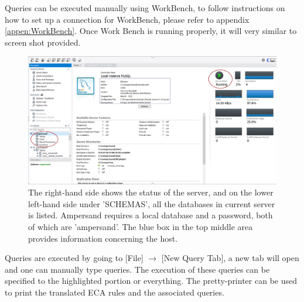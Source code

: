 Queries can be executed manually using WorkBench, to follow instructions on how 
to set up a connection for WorkBench, please refer to appendix 
\ref{appen:WorkBench}. Once Work Bench is running properly, it will very 
similar to screen shot provided.
\begin{figure}[!h]
    \includegraphics[width=\textwidth]{images/WorkBench}
    \caption{\footnotesize{The right-hand side shows the status of the server, 
    and on the lower left-hand side under 'SCHEMAS', all the databases in 
    current server is listed. Ampersand requires a local database and a 
    password, both of which are 'ampersand'. The blue box in the top middle 
    area provides information concerning the host. }}
\end{figure}

Queries are executed by going to [File] $\rightarrow$ [New Query Tab], a new 
tab will open and one can manually type queries. The execution of these queries 
can be specified to the highlighted portion or everything. The pretty-printer 
can be used to print the translated ECA rules and the associated queries.
\